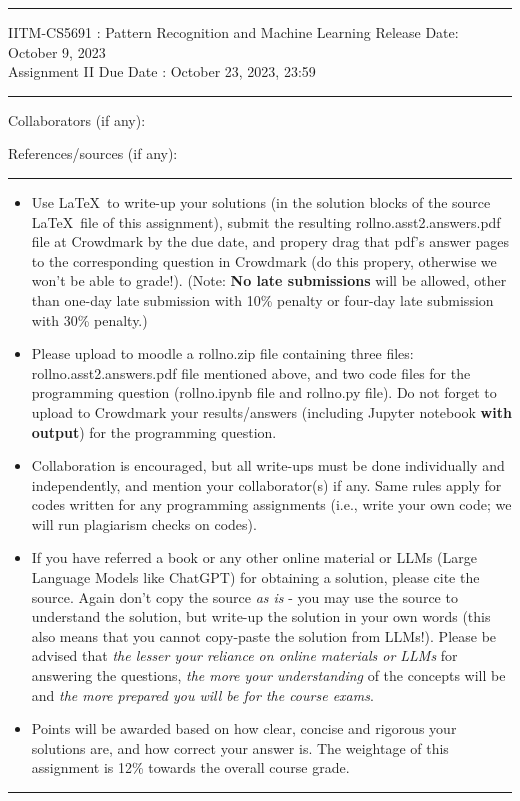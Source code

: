 \documentclass[solution,addpoints,12pt]{exam}
\begin{document}
\hrule
\vspace{3mm}
\noindent 
{\sf IITM-CS5691 : Pattern Recognition and Machine Learning  \hfill Release Date: October 9, 2023}
\\
\noindent 
{\sf Assignment II \hfill Due Date : October 23, 2023, 23:59}
\vspace{3mm}
\hrule
\vspace{3mm}

\noindent
{{\sf Collaborators (if any): }} %

\noindent
{{\sf References/sources (if any): 
}} %


\vspace{3mm}
\hrule
{\small
\begin{itemize}
\item Use \LaTeX\ to write-up your solutions (in the solution blocks of the source \LaTeX\ file of this assignment), submit the resulting rollno.asst2.answers.pdf file at Crowdmark by the due date, and propery drag that pdf's answer pages to the corresponding question in Crowdmark (do this propery, otherwise we won't be able to grade!). (Note: {\bf No late submissions} will be allowed, other than one-day late submission with 10\% penalty or four-day late submission with 30\% penalty.)%
\item Please upload to moodle a rollno.zip file containing three files:  rollno.asst2.answers.pdf file mentioned above, and  two code files for the programming question (rollno.ipynb file and rollno.py file). Do not forget to upload to Crowdmark your results/answers (including Jupyter notebook {\bf with output}) for the programming question.
\item Collaboration is encouraged, but all write-ups must be done individually and independently, and mention your collaborator(s) if any. Same rules apply for codes written for any programming assignments (i.e., write your own code; we will run plagiarism checks on codes).
\item  If you have referred a book or any other online material or LLMs (Large Language Models like ChatGPT) for obtaining a solution, please cite the source. Again don't copy the source {\it as is} - you may use the source to understand the solution, but write-up the solution in your own words (this also means that you cannot copy-paste the solution from LLMs!). Please be advised that {\it the lesser your reliance on online materials or LLMs} for answering the questions, {\it the more your understanding} of the concepts will be and {\it the more prepared you will be for the course exams}.  
\item Points will be awarded based on how clear, concise and rigorous your solutions are, and how correct your answer is. The weightage of this assignment is 12\% towards the overall course grade. 
\end{itemize}
}
\hrule
\end{document}
